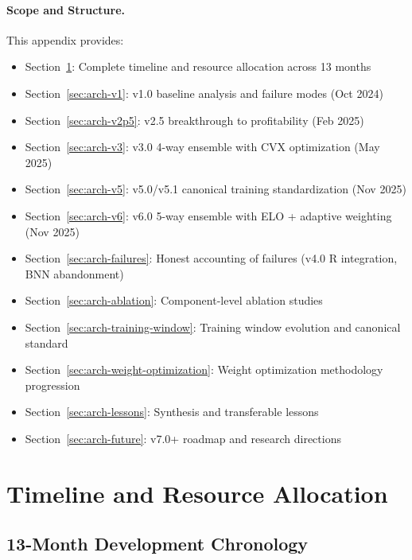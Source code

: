 \paragraph{Scope and Structure.}
This appendix provides:
\begin{itemize}[itemsep=2pt,parsep=0pt]
    \item Section~\ref{sec:arch-timeline}: Complete timeline and resource allocation across 13 months
    \item Section~\ref{sec:arch-v1}: v1.0 baseline analysis and failure modes (Oct 2024)
    \item Section~\ref{sec:arch-v2p5}: v2.5 breakthrough to profitability (Feb 2025)
    \item Section~\ref{sec:arch-v3}: v3.0 4-way ensemble with CVX optimization (May 2025)
    \item Section~\ref{sec:arch-v5}: v5.0/v5.1 canonical training standardization (Nov 2025)
    \item Section~\ref{sec:arch-v6}: v6.0 5-way ensemble with ELO + adaptive weighting (Nov 2025)
    \item Section~\ref{sec:arch-failures}: Honest accounting of failures (v4.0 R integration, BNN abandonment)
    \item Section~\ref{sec:arch-ablation}: Component-level ablation studies
    \item Section~\ref{sec:arch-training-window}: Training window evolution and canonical standard
    \item Section~\ref{sec:arch-weight-optimization}: Weight optimization methodology progression
    \item Section~\ref{sec:arch-lessons}: Synthesis and transferable lessons
    \item Section~\ref{sec:arch-future}: v7.0+ roadmap and research directions
\end{itemize}

\section{Timeline and Resource Allocation}
\label{sec:arch-timeline}

\subsection{13-Month Development Chronology}

